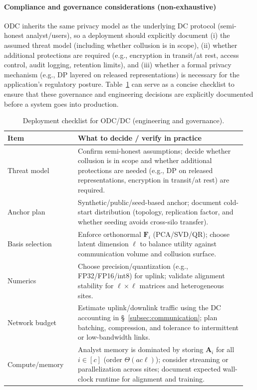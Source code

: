 \documentclass[final,3p,times]{elsarticle}
\theoremstyle{plain}
\newcommand{\matr}[1]{\bm{#1}}        %
\begin{document}
\paragraph{Compliance and governance considerations (non-exhaustive)}
ODC inherits the same privacy model as the underlying DC protocol (semi-honest analyst/users), so a deployment should explicitly document (i) the assumed threat model (including whether collusion is in scope), (ii) whether additional protections are required (e.g., encryption in transit/at rest, access control, audit logging, retention limits), and (iii) whether a formal privacy mechanism (e.g., DP layered on released representations) is necessary for the application’s regulatory posture. Table~\ref{tab:deployment_checklist} can serve as a concise checklist to ensure that these governance and engineering decisions are explicitly documented before a system goes into production.

\begin{table}[t]
\centering
\caption{Deployment checklist for ODC/DC (engineering and governance).}
\label{tab:deployment_checklist}
\begin{tabular}{p{0.28\linewidth} p{0.67\linewidth}}
\hline
\textbf{Item} & \textbf{What to decide / verify in practice} \\
\hline
Threat model &
Confirm semi-honest assumptions; decide whether collusion is in scope and whether additional protections are needed
(e.g., DP on released representations, encryption in transit/at rest) are required. \\
Anchor plan &
Synthetic/public/seed-based anchor; document cold-start distribution (topology, replication factor, and
whether seeding avoids cross-silo transfer). \\
Basis selection &
Enforce orthonormal $\matr{F}_i$ (PCA/SVD/QR); choose latent dimension $\ell$ to balance utility against
communication volume and collusion surface. \\
Numerics &
Choose precision/quantization (e.g., FP32/FP16/int8) for uplink; validate alignment stability for $\ell\times\ell$
matrices and heterogeneous sites. \\
Network budget &
Estimate uplink/downlink traffic using the DC accounting in \S~\ref{subsec:communication}; plan batching,
compression, and tolerance to intermittent or low-bandwidth links. \\
Compute/memory &
Analyst memory is dominated by storing $\matr{A}_i$ for all $i \in [c]$ (order $\Theta(ac\ell)$); consider
streaming or parallelization across sites; document expected wall-clock runtime for alignment and training. \\
\hline
\end{tabular}
\end{table}
\end{document}
